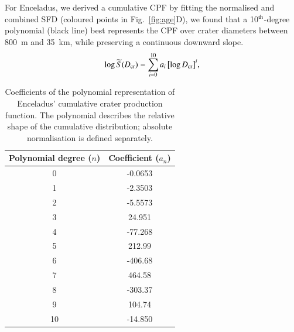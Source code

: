 \documentclass[preprint,11pt,3p,times,authoryear]{elsarticle}
\begin{document}
For Enceladus, we derived a cumulative CPF by fitting the normalised and combined SFD (coloured points in Fig.~\ref{fig:age}D), we found that a 10$^{\rm th}$-degree polynomial (black line) best represents the CPF over crater diameters between 800~m and 35~km, while preserving a continuous downward slope.\\
\begin{equation}
    \log \widetilde{S}(D_{\rm cr}) = \sum_{i=0}^{10} a_i \, \bigl[\log D_{\rm cr}\bigr]^i,
    \label{equ:cpf_scale}
\end{equation}
%
\begin{table}[H]%
\centering
\begin{tabular}{cc}
\hline
  \textbf{Polynomial degree ($n$)} & \textbf{Coefficient ($a_n$)} \\
\hline
0 & -0.0653  \\
1 & -2.3503 \\
2 & -5.5573 \\
3 & 24.951  \\
4 & -77.268 \\
5 & 212.99  \\
6 & -406.68 \\
7 & 464.58  \\
8 & -303.37 \\
9 & 104.74  \\
10 & -14.850 \\
\hline
\end{tabular}
\caption{Coefficients of the polynomial representation of Enceladus’ cumulative crater production function. The polynomial describes the relative shape of the cumulative distribution; absolute normalisation is defined separately.}
\label{tab:cpf}
\end{table}
\end{document}
